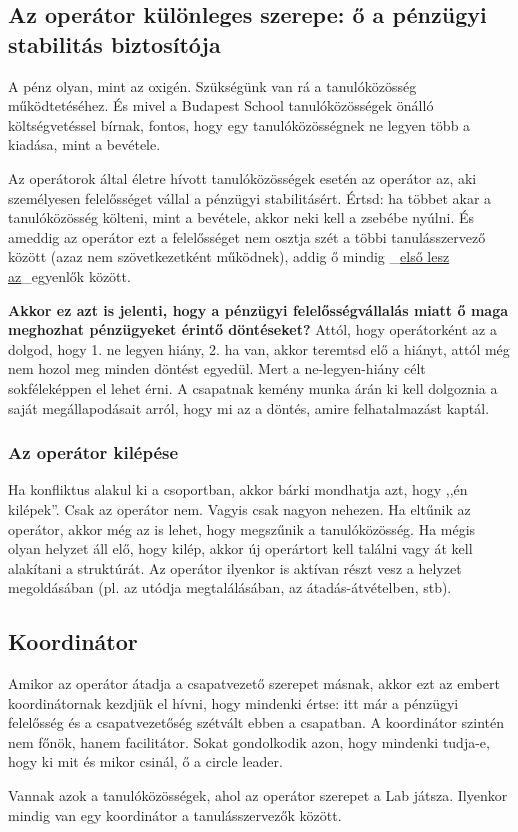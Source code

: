\hypertarget{az-operator-kulonleges-szerepe-o-a-penzugyi-stabilitas-biztositoja}{%
\subsection{Az operátor különleges szerepe: ő a pénzügyi stabilitás
biztosítója}\label{az-operator-kulonleges-szerepe-o-a-penzugyi-stabilitas-biztositoja}}

A pénz olyan, mint az oxigén. Szükségünk van rá a tanulóközösség
működtetéséhez. És mivel a Budapest School tanulóközösségek önálló
költségvetéssel bírnak, fontos, hogy egy tanulóközösségnek ne legyen
több a kiadása, mint a bevétele.

Az operátorok által életre hívott tanulóközösségek esetén az operátor
az, aki személyesen felelősséget vállal a pénzügyi stabilitásért. Értsd:
ha többet akar a tanulóközösség költeni, mint a bevétele, akkor neki
kell a zsebébe nyúlni. És ameddig az operátor ezt a felelősséget nem
osztja szét a többi tanulásszervező között (azaz nem szövetkezetként
működnek), addig ő mindig
\_\href{https://en.wikipedia.org/wiki/Primus_inter_pares}{első lesz
az}\_egyenlők között.

\textbf{Akkor ez azt is jelenti, hogy a pénzügyi felelősségvállalás
miatt ő maga meghozhat pénzügyeket érintő döntéseket?} Attól, hogy
operátorként az a dolgod, hogy 1. ne legyen hiány, 2. ha van, akkor
teremtsd elő a hiányt, attól még nem hozol meg minden döntést egyedül.
Mert a ne-legyen-hiány célt sokféleképpen el lehet érni. A csapatnak
kemény munka árán ki kell dolgoznia a saját megállapodásait arról, hogy
mi az a döntés, amire felhatalmazást kaptál.

\hypertarget{az-operator-kilepese}{%
\subsubsection{Az operátor kilépése}\label{az-operator-kilepese}}

Ha konfliktus alakul ki a csoportban, akkor bárki mondhatja azt, hogy
,,én kilépek''. Csak az operátor nem. Vagyis csak nagyon nehezen. Ha
eltűnik az operátor, akkor még az is lehet, hogy megszűnik a
tanulóközösség. Ha mégis olyan helyzet áll elő, hogy kilép, akkor új
operártort kell találni vagy át kell alakítani a struktúrát. Az operátor
ilyenkor is aktívan részt vesz a helyzet megoldásában (pl. az utódja
megtalálásában, az átadás-átvételben, stb).

\hypertarget{koordinator}{%
\subsection{Koordinátor}\label{koordinator}}

Amikor az operátor átadja a csapatvezető szerepet másnak, akkor ezt az
embert koordinátornak kezdjük el hívni, hogy mindenki értse: itt már a
pénzügyi felelősség és a csapatvezetőség szétvált ebben a csapatban. A
koordinátor szintén nem főnök, hanem facilitátor. Sokat gondolkodik
azon, hogy mindenki tudja-e, hogy ki mit és mikor csinál, ő a circle
leader.

Vannak azok a tanulóközösségek, ahol az operátor szerepet a Lab játsza.
Ilyenkor mindig van egy koordinátor a tanulásszervezők között.
